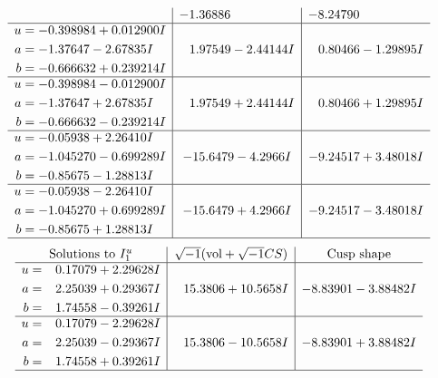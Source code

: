 \documentclass[1p]{elsarticle_modified}
\theoremstyle{definition}
\newcommand{\I}{\sqrt{-1}}
\begin{document}
$$\begin{array}{c|c|c}
 & -1.36886\phantom{ +0.000000I} & -8.24790\phantom{ +0.000000I} \\ \hline\begin{aligned}
u &= -0.398984 + 0.012900 I \\
a &= -1.37647 - 2.67835 I \\
b &= -0.666632 + 0.239214 I\end{aligned}
 & \phantom{-}1.97549 - 2.44144 I & \phantom{-}0.80466 - 1.29895 I \\ \hline\begin{aligned}
u &= -0.398984 - 0.012900 I \\
a &= -1.37647 + 2.67835 I \\
b &= -0.666632 - 0.239214 I\end{aligned}
 & \phantom{-}1.97549 + 2.44144 I & \phantom{-}0.80466 + 1.29895 I \\ \hline\begin{aligned}
u &= -0.05938 + 2.26410 I \\
a &= -1.045270 - 0.699289 I \\
b &= -0.85675 - 1.28813 I\end{aligned}
 & -15.6479 - 4.2966 I & -9.24517 + 3.48018 I \\ \hline\begin{aligned}
u &= -0.05938 - 2.26410 I \\
a &= -1.045270 + 0.699289 I \\
b &= -0.85675 + 1.28813 I\end{aligned}
 & -15.6479 + 4.2966 I & -9.24517 - 3.48018 I\\
 \hline 
 \end{array}$$\newpage$$\begin{array}{c|c|c}  
\text{Solutions to }I^u_{1}& \I (\text{vol} + \sqrt{-1}CS) & \text{Cusp shape}\\
 \hline 
\begin{aligned}
u &= \phantom{-}0.17079 + 2.29628 I \\
a &= \phantom{-}2.25039 + 0.29367 I \\
b &= \phantom{-}1.74558 - 0.39261 I\end{aligned}
 & \phantom{-}15.3806 + 10.5658 I & -8.83901 - 3.88482 I \\ \hline\begin{aligned}
u &= \phantom{-}0.17079 - 2.29628 I \\
a &= \phantom{-}2.25039 - 0.29367 I \\
b &= \phantom{-}1.74558 + 0.39261 I\end{aligned}
 & \phantom{-}15.3806 - 10.5658 I & -8.83901 + 3.88482 I\\
 \hline 
 \end{array}$$\newpage\newpage\renewcommand{\arraystretch}{1}
\end{document}

